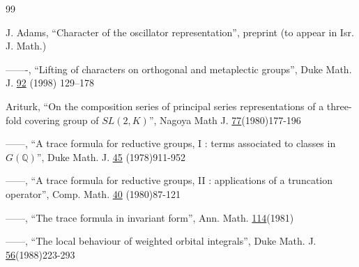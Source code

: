 \documentclass[12pt,letterpaper]{book}
\theoremstyle{plain}
\theoremstyle{definition}
\theoremstyle{remark}
\theoremstyle{remark}
\begin{document}
\begin{thebibliography}{99}

 J. Adams, ``Character of the oscillator representation'',
preprint (to appear in Isr. J. Math.)

 -------,
``Lifting of characters on orthogonal and metaplectic groups'',
Duke Math. J. \underline{92} (1998) 129--178


 Ariturk, ``On the composition series of principal series
representations of a three-fold covering group of $SL(2,K)$'', Nagoya Math
J. \underline{77}(1980)177-196


 ------,
``A trace formula for reductive groups, I : terms associated to
classes in $G(\mathbb{Q})$'', Duke Math. J. \underline{45} (1978)911-952

  ------,
``A trace formula for reductive groups, II : applications of a
truncation operator'', Comp. Math. \underline{40} (1980)87-121



 ------, ``The trace formula in invariant form'', Ann. Math.
\underline{114}(1981)

 ------, ``The local behaviour of weighted orbital integrals'',
Duke Math. J. \underline{56}(1988)223-293





\end{thebibliography}
\end{document}
